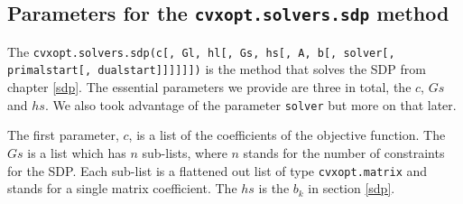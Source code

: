 \subsection{Parameters for the \texttt{cvxopt.solvers.sdp} method}
\label{parasdp}
The \texttt{cvxopt.solvers.sdp(c[, Gl, hl[, Gs, hs[, A, b[, solver[, primalstart[, dualstart]]]]]])} is the method that solves the SDP from chapter \ref{sdp}. The essential parameters we provide are three in total, the $c$, $Gs$ and $hs$. We also took advantage of the parameter \texttt{solver} but more on that later.

The first parameter, $c$, is a list of the coefficients of the objective function. 
The $Gs$ is a list which has $n$  sub-lists, where $n$ stands for the number of constraints for the SDP. Each sub-list is a flattened out list of type \texttt{cvxopt.matrix} and stands for a single matrix coefficient. 
The $hs$ is the $b_k$ in section \ref{sdp}.

